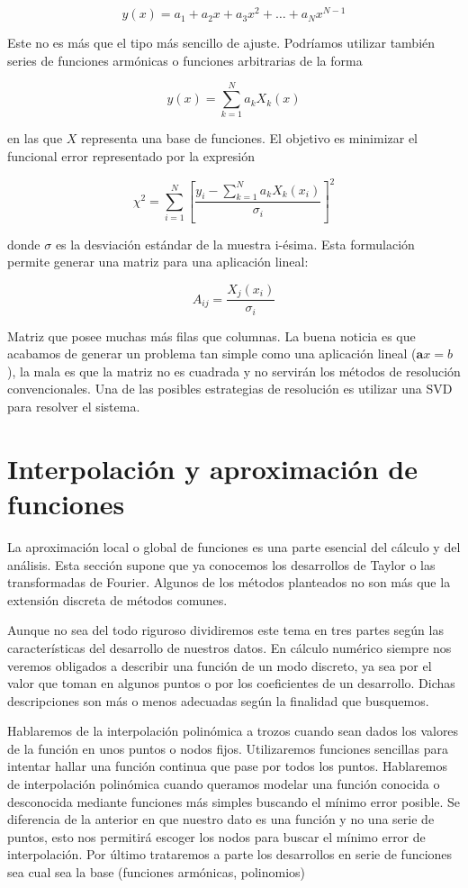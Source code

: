 $$
y(x)=a_{1}+a_{2}x+a_{3}x^{2}+\ldots+a_{N}x^{N-1}$$

Este no es más que el tipo más sencillo de ajuste. Podríamos utilizar
también series de funciones armónicas o funciones arbitrarias de la
forma

$$
y(x)=\sum_{k=1}^{N}a_{k}X_{k}(x)$$

en las que $X$ representa una base de funciones. El objetivo es
minimizar el funcional error representado por la expresión

$$
\chi^{2}=\sum_{i=1}^{N}\left[
  \frac{y_{i}-\sum_{k=1}^{N}a_{k}X_{k}(x_{i})}{\sigma_{i}}\right]^{2}
$$

donde $\sigma$ es la desviación estándar de la muestra i-ésima. Esta
formulación permite generar una matriz para una aplicación lineal:

$$
A_{ij}=\frac{X_{j}(x_{i})}{\sigma_{i}}$$

Matriz que posee muchas más filas que columnas. La buena noticia es
que acabamos de generar un problema tan simple como una aplicación
lineal ($\mathbf{a}x=b$), la mala es que la matriz no es cuadrada y no
servirán los métodos de resolución convencionales. Una de las posibles
estrategias de resolución es utilizar una SVD para resolver el
sistema.

\section{Interpolación y aproximación de funciones}

La aproximación local o global de funciones es una parte esencial del
cálculo y del análisis.  Esta sección supone que ya conocemos los
desarrollos de Taylor o las transformadas de Fourier.  Algunos de los
métodos planteados no son más que la extensión discreta de métodos
comunes.

Aunque no sea del todo riguroso dividiremos este tema en tres partes
según las características del desarrollo de nuestros datos.  En
cálculo numérico siempre nos veremos obligados a describir una función
de un modo discreto, ya sea por el valor que toman en algunos puntos o
por los coeficientes de un desarrollo.  Dichas descripciones son más o
menos adecuadas según la finalidad que busquemos.

Hablaremos de la interpolación polinómica a trozos cuando sean dados
los valores de la función en unos puntos o nodos fijos.  Utilizaremos
funciones sencillas para intentar hallar una función continua que pase
por todos los puntos.  Hablaremos de interpolación polinómica cuando
queramos modelar una función conocida o desconocida mediante funciones
más simples buscando el mínimo error posible.  Se diferencia de la
anterior en que nuestro dato es una función y no una serie de puntos,
esto nos permitirá escoger los nodos para buscar el mínimo error de
interpolación.  Por último trataremos a parte los desarrollos en serie
de funciones sea cual sea la base (funciones armónicas, polinomios)

